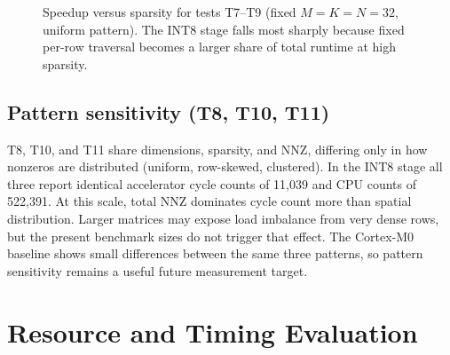 \begin{figure}[htbp]
  \centering
  \caption{Speedup versus sparsity for tests T7--T9 (fixed
           $M = K = N = 32$, uniform pattern). The INT8 stage falls most
           sharply because fixed per-row traversal becomes a larger share
           of total runtime at high sparsity.}
  \label{fig:speedup-sparsity}
\end{figure}

\subsection{Pattern sensitivity (T8, T10, T11)}

T8, T10, and T11 share dimensions, sparsity, and NNZ, differing only
in how nonzeros are distributed (uniform, row-skewed, clustered). In
the INT8 stage all three report identical accelerator cycle counts of
11,039 and CPU counts of 522,391. At this scale, total NNZ dominates
cycle count more than spatial distribution. Larger matrices may expose
load imbalance from very dense rows, but the present benchmark sizes do
not trigger that effect. The Cortex-M0 baseline shows small differences
between the same three patterns, so pattern sensitivity remains a useful
future measurement target.

\section{Resource and Timing Evaluation}
\label{sec:resources}


